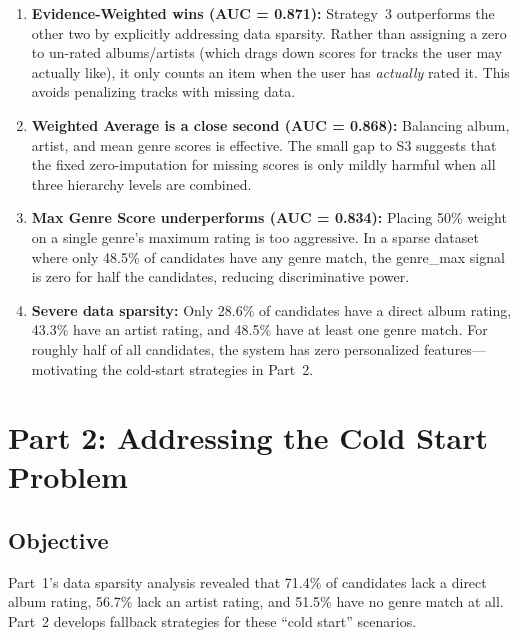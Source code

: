 \documentclass[12pt]{article}
\begin{document}
\begin{enumerate}
	\item \textbf{Evidence-Weighted wins (AUC = 0.871):} Strategy~3 outperforms the other two by explicitly addressing data sparsity. Rather than assigning a zero to un-rated albums/artists (which drags down scores for tracks the user may actually like), it only counts an item when the user has \emph{actually} rated it. This avoids penalizing tracks with missing data.

	\item \textbf{Weighted Average is a close second (AUC = 0.868):} Balancing album, artist, and mean genre scores is effective. The small gap to S3 suggests that the fixed zero-imputation for missing scores is only mildly harmful when all three hierarchy levels are combined.
	\newpage
	\item \textbf{Max Genre Score underperforms (AUC = 0.834):} Placing 50\% weight on a single genre's maximum rating is too aggressive. In a sparse dataset where only 48.5\% of candidates have any genre match, the genre\_max signal is zero for half the candidates, reducing discriminative power.

	\item \textbf{Severe data sparsity:} Only 28.6\% of candidates have a direct album rating, 43.3\% have an artist rating, and 48.5\% have at least one genre match. For roughly half of all candidates, the system has zero personalized features---motivating the cold-start strategies in Part~2.
\end{enumerate}

\newpage
\section{Part 2: Addressing the Cold Start Problem}

\subsection{Objective}

Part~1's data sparsity analysis revealed that 71.4\% of candidates lack a direct album rating, 56.7\% lack an artist rating, and 51.5\% have no genre match at all. Part~2 develops fallback strategies for these ``cold start'' scenarios.

\end{document}
